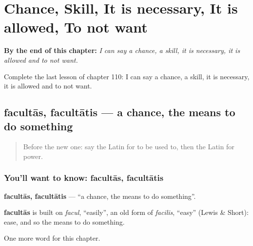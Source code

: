 
\chapter{Chance, Skill, It is necessary, It is allowed, To not want}
\label{ch:la-chance-skill-it-is-necessary-it-is-allowed-to-not-want}

\begin{chapteropening}
\textbf{By the end of this chapter:} \emph{I can say a chance, a skill, it is necessary, it is allowed and to not want.}

Complete the last lesson of chapter 110: I can say a chance, a skill, it is necessary, it is allowed and to not want.
\end{chapteropening}

\section[facultās, facultātis]{facultās, facultātis — a chance, the means to do something}

\label{lesson:LA-C110-facultas}



\begin{quote}
Before the new one: say the Latin for to be used to, then the Latin for power.
\end{quote}

\subsection*{You'll want to know: facultās, facultātis}
\textbf{facultās, facultātis} — \textquotedblleft{}a chance, the means to do something\textquotedblright{}.

\begin{cousinweb}
\textbf{facultās} is built on \emph{facul}, \textquotedblleft{}easily\textquotedblright{}, an old form of \emph{facilis}, \textquotedblleft{}easy\textquotedblright{} (Lewis \& Short): ease, and so the means to do something.
\end{cousinweb}

\begin{grammarlens}[title={What you've built}]
One more word for this chapter.
\end{grammarlens}

